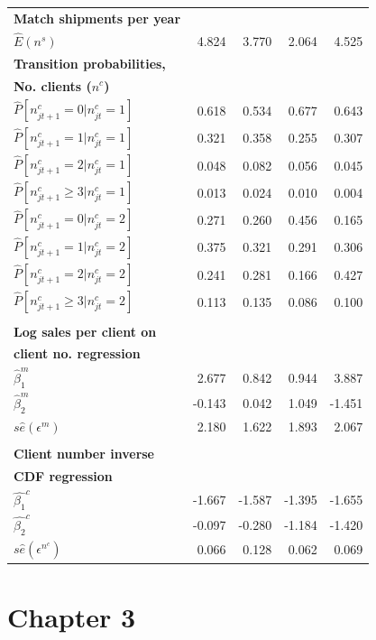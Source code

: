 \begin{small}
\begin{longtable}{l|rrrr}
\textbf{Match shipments per year} &  &  &  &  \\ 
$\widehat{E}\left( n^{s}\right) $ & 4.824 & 3.770 & 2.064 & 4.525 \\
\textbf{Transition probabilities, } &  &  &  &  \\ 
\textbf{No. clients (}$n^{c}$\textbf{)} &  &  &  &  \\ 
$\widehat{P}[n_{jt+1}^{c}=0|n_{jt}^{c}=1]$ & 0.618 & 0.534 & 0.677 & 0.643
\\ 
$\widehat{P}[n_{jt+1}^{c}=1|n_{jt}^{c}=1]$ & 0.321 & 0.358 & 0.255 & 0.307
\\ 
$\widehat{P}[n_{jt+1}^{c}=2|n_{jt}^{c}=1]$ & 0.048 & 0.082 & 0.056 & 0.045
\\ 
$\widehat{P}[n_{jt+1}^{c}\geq 3|n_{jt}^{c}=1]$ & 0.013 & 0.024 & 0.010 & 
0.004 \\ 
$\widehat{P}[n_{jt+1}^{c}=0|n_{jt}^{c}=2]$ & 0.271 & 0.260 & 0.456 & 0.165
\\ 
$\widehat{P}[n_{jt+1}^{c}=1|n_{jt}^{c}=2]$ & 0.375 & 0.321 & 0.291 & 0.306
\\ 
$\widehat{P}[n_{jt+1}^{c}=2|n_{jt}^{c}=2]$ & 0.241 & 0.281 & 0.166 & 0.427
\\ 
$\widehat{P}[n_{jt+1}^{c}\geq 3|n_{jt}^{c}=2]$ & 0.113 & 0.135 & 0.086 & 
0.100 \\ 
&  &  &  &  \\ 
\textbf{Log sales per client on} &  &  &  &  \\ 
\textbf{client no. regression} &  &  &  &  \\ 
$\widehat{\beta }_{1}^{m}$ & 2.677 & 0.842 & 0.944 & 3.887 \\ 
$\widehat{\beta }_{2}^{m}$ & -0.143 & 0.042 & 1.049 & -1.451 \\ 
$s\widehat{e}(\epsilon ^{m})$ & 2.180 & 1.622 & 1.893 & 2.067 \\ 
&  &  &  &  \\ 
\textbf{Client number inverse} &  &  &  &  \\ 
\textbf{CDF regression} &  &  &  &  \\ 
$\widehat{\beta _{1}}^{c}$ & -1.667 & -1.587 & -1.395 & -1.655 \\ 
$\widehat{\beta _{2}}^{c}$ & -0.097 & -0.280 & -1.184 & -1.420 \\ 
$s\widehat{e}(\epsilon ^{n^{c}})$ & 0.066 & 0.128 & 0.062 & 0.069 \\ \hline
\end{longtable}
\end{small}

\chapter{Chapter 3}
\label{sec:ap3}


